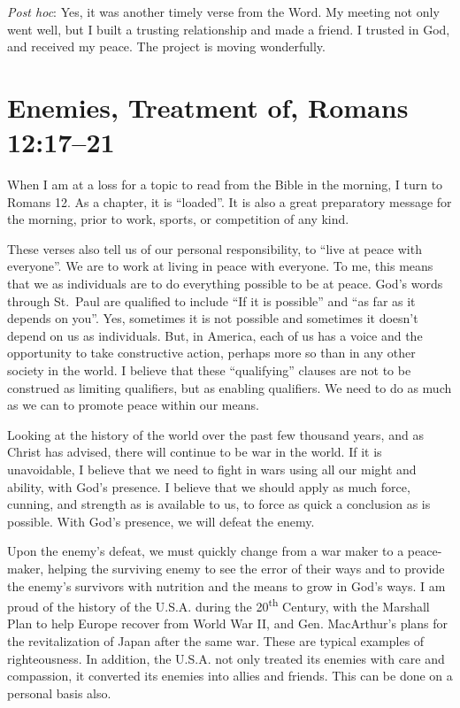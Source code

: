 \documentclass[12pt]{memoir}
\begin{document}
\emph{Post hoc}: Yes, it was another timely verse from the Word. My
meeting not only went well, but I built a trusting relationship and
made a friend. I trusted in God, and received my peace. The project
is moving wonderfully. 

\section{Enemies, Treatment of, Romans 12:17--21}

When I am at a loss for a topic to read from the Bible in the morning,
I turn to Romans 12. As a chapter, it is ``loaded''. It is also
a great preparatory message for the morning, prior to work, sports,
or competition of any kind.

These verses also tell us of our personal responsibility, to ``live
at peace with everyone''. We are to work at living in peace with
everyone. To me, this means that we as individuals are to do everything
possible to be at peace.
God's words through St.~Paul are qualified
to include ``If it is possible'' and ``as far as it depends on
you''. Yes, sometimes it is not possible and sometimes it doesn't
depend on us as individuals. But, in America, each of us has a voice
and the opportunity to take constructive action, perhaps more so than
in any other society in the world. I believe that these ``qualifying''
clauses are not to be construed as limiting qualifiers, but as enabling
qualifiers. We need to do as much as we can to promote peace within
our means.

Looking at the history of the world over the past few thousand years,
and as Christ has advised, there will continue to be war in the world.
If it is unavoidable, I believe that we need to fight in wars using
all our might and ability, with God's presence. I believe that we
should apply as much force, cunning, and strength as is available
to us, to force as quick a conclusion as is possible. With God's presence,
we will defeat the enemy.

Upon the enemy's defeat, we must quickly change from a war maker to
a peace-maker, helping the surviving enemy to see the error of their
ways and to provide the enemy's survivors with nutrition and the means
to grow in God's ways. I am proud of the history of the U.S.A. during
the 20\textsuperscript{th} Century, with the Marshall Plan to help
Europe recover from World War II, and Gen. MacArthur's plans for the
revitalization of Japan after the same war. These are typical examples
of righteousness. In addition, the U.S.A. not only treated its enemies
with care and compassion, it converted its enemies into allies and
friends. This can be done on a personal basis also.
\end{document}
